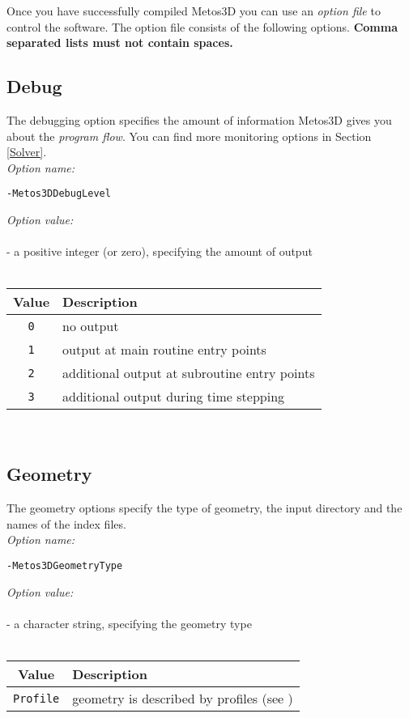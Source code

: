\documentclass{article}
\begin{document}
Once you have successfully compiled Metos3D you can use an \emph{option file}
to control the software. The option file consists of the following options.
\textbf{Comma separated lists must not contain spaces.} 

%
%
\subsection{Debug}

The debugging option specifies the amount of information Metos3D gives you
about the \emph{program flow}. You can find more monitoring options in Section \ref{Solver}. \\

\emph{Option name:}
\begin{verbatim}
-Metos3DDebugLevel
\end{verbatim}

\emph{Option value:} \\
\vspace{-0.3cm}\\
- a positive integer (or zero), specifying the amount of output \\
\\
\begin{tabular}{c|l}
Value & Description \\ \hline
\texttt{0} & no output \\
\texttt{1} & output at main routine entry points \\
\texttt{2} & additional output at subroutine entry points \\
\texttt{3} & additional output during time stepping
\end{tabular} \\

%
%
\subsection{Geometry}

The geometry options specify the type of geometry,
the input directory and the names of the index files. \\

\emph{Option name:}
\begin{verbatim}
-Metos3DGeometryType                                
\end{verbatim}

\emph{Option value:} \\
\vspace{-0.3cm}\\
- a character string, specifying the geometry type \\
\\
\begin{tabular}{c|l}
Value & Description \\ \hline
\texttt{Profile} & geometry is described by profiles (see \cite{KhViCa05})
\end{tabular} \\
\end{document}
